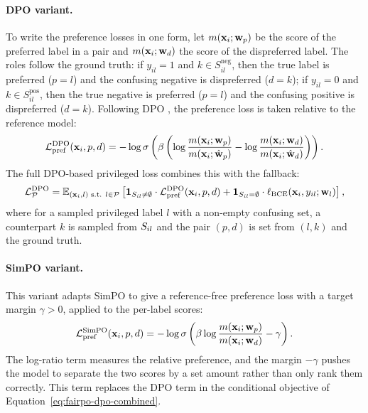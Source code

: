\paragraph{DPO variant.}
To write the preference losses in one form, let $m(\mathbf{x}_i; \mathbf{w}_p)$
be the score of the preferred label in a pair and
$m(\mathbf{x}_i; \mathbf{w}_d)$ the score of the dispreferred label. The roles
follow the ground truth: if $y_{il}=1$ and $k \in S_{il}^{\text{neg}}$, then the
true label is preferred ($p=l$) and the confusing negative is dispreferred
($d=k$); if $y_{il}=0$ and $k \in S_{il}^{\text{pos}}$, then the true negative is
preferred ($p=l$) and the confusing positive is dispreferred ($d=k$). Following DPO
\citep{rafailov2023direct}, the preference loss is taken relative to the reference
model:
\begin{equation}
	\mathcal{L}_{\text{pref}}^{\text{DPO}}(\mathbf{x}_i, p, d) = -\log \sigma \left( \beta \left( \log \frac{m(\mathbf{x}_i; \mathbf{w}_p)}{m(\mathbf{x}_i; \hat{\mathbf{w}}_p)} - \log \frac{m(\mathbf{x}_i; \mathbf{w}_d)}{m(\mathbf{x}_i; \hat{\mathbf{w}}_d)} \right) \right).
	\label{eq:fairpo-dpo-pref}
\end{equation}
The full DPO-based privileged loss combines this with the fallback:
\begin{align}
	\mathcal{L}_{\mathcal{P}}^{\text{DPO}} = \mathbb{E}_{(\mathbf{x}_i,l) \text{ s.t. } l \in \mathcal{P}}
	\left[
	\mathbf{1}_{S_{il} \neq \emptyset} \cdot \mathcal{L}_{\text{pref}}^{\text{DPO}}(\mathbf{x}_i, p, d) + \mathbf{1}_{S_{il} = \emptyset} \cdot \ell_{\text{BCE}}(\mathbf{x}_i, y_{il}; \mathbf{w}_l)
	\right],
	\label{eq:fairpo-dpo-combined}
\end{align}
where for a sampled privileged label $l$ with a non-empty confusing set, a
counterpart $k$ is sampled from $S_{il}$ and the pair $(p,d)$ is set from
$(l,k)$ and the ground truth.

\paragraph{SimPO variant.}
This variant adapts SimPO \citep{meng2024simpo} to give
a reference-free preference loss with a target margin $\gamma > 0$, applied to the
per-label scores:
\begin{equation}
	\mathcal{L}_{\text{pref}}^{\text{SimPO}}(\mathbf{x}_i, p, d) = -\log \sigma \left( \beta \log \frac{m(\mathbf{x}_i; \mathbf{w}_p)}{m(\mathbf{x}_i; \mathbf{w}_d)} - \gamma \right).
	\label{eq:fairpo-simpo-pref}
\end{equation}
The log-ratio term measures the relative preference, and the margin $-\gamma$ pushes
the model to separate the two scores by a set amount rather than only rank them
correctly. This term replaces the DPO term in the conditional objective of
Equation~\ref{eq:fairpo-dpo-combined}.

